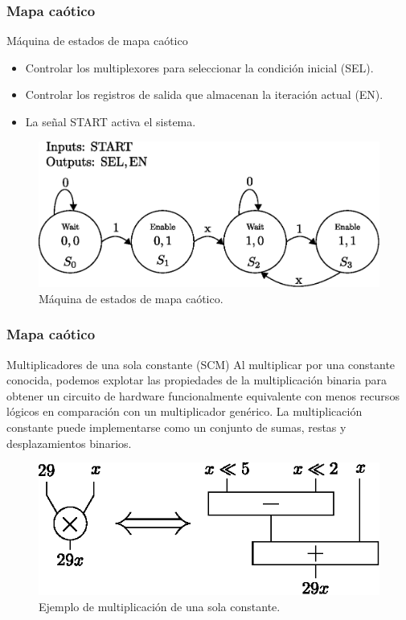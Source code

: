 \documentclass[10pt]{beamer}
\begin{document}
\begin{frame}
    \frametitle{Mapa caótico}
        \begin{block}{Máquina de estados de mapa caótico}
            \justifying
            \begin{itemize}
                \item Controlar los multiplexores para seleccionar la condición inicial (SEL).
                \item Controlar los registros de salida que almacenan la iteración actual (EN).
                \item La señal START activa el sistema.
            \end{itemize}
	    \end{block}
        \begin{figure}[hbtp]
            \centering
            \includegraphics[width=0.6\linewidth]{B2_fsm_cm}
            \caption{Máquina de estados de mapa caótico.}
            \label{fig:B2_fsm_cm}
        \end{figure}
\end{frame}

        
\begin{frame}
    \frametitle{Mapa caótico}
        \begin{block}{Multiplicadores de una sola constante (SCM)}
            \justifying
            Al multiplicar por una constante conocida, podemos explotar las propiedades de la multiplicación binaria para obtener un circuito de hardware funcionalmente equivalente con menos recursos lógicos en comparación con un multiplicador genérico. La multiplicación constante puede implementarse como un conjunto de sumas, restas y desplazamientos binarios.
	    \end{block}
	    \begin{figure}[hbtp]
            \centering
            \includegraphics[width=0.6\linewidth]{J1_scm}
            \caption{Ejemplo de multiplicación de una sola constante.}
            \label{fig:J1_scm}
        \end{figure}

\end{frame}
\end{document}
